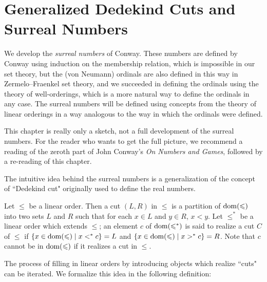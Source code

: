 \chapter[Surreal Numbers]{Generalized Dedekind Cuts and\\ Surreal Numbers}


We develop the {\itshape surreal numbers\/} of Conway.
These numbers are defined by Conway using induction on the
membership relation, which is impossible in our set
theory, but the (von Neumann) ordinals are also 
defined in this way in Zermelo--Fraenkel set
theory, and we succeeded in
defining the ordinals using the theory of
well-orderings, which is a more natural way to
define the ordinals in any case.  The surreal numbers will be defined
using concepts from the theory of linear orderings in a way analogous to the way in which the ordinals were
defined.

This chapter is really only a sketch, not a full development of the
surreal numbers.  For the reader who wants to get the full picture, we
recommend a reading of the zeroth part of John Conway's {\itshape On
Numbers and Games}, followed by a re-reading of this chapter.

The intuitive idea behind the surreal numbers is a
generalization of the concept of ``Dedekind cut" originally
used to define the real numbers.

\begin{definition}
 Let $\leq$ be a linear order.  Then a {\upshape cut}
 $(L,R)$ in $\leq$ is a partition of $\mathop{\mathrm{dom}}(\leqslant)$ into two
 sets $L$ and $R$ such that for each $x \in L$ 
 and $y \in R$, $x < y$.  Let $\leq^*$ be a linear order which extends $\leq$;
 an element $c$ of $\mathop{\mathrm{dom}}(\leqslant^*)$ is said to {\upshape realize} a cut $C$ of
 $\leq$ if $\{x \in \mathop{\mathrm{dom}}(\leqslant) \mid x <^* c\} = L$ and $\{x \in \mathop{\mathrm{dom}}(\leqslant) \mid x
 >^* c\} =  R$.  Note that $c$ cannot be in $\mathop{\mathrm{dom}}(\leqslant)$ if it realizes a cut
 in $\leq$.
\end{definition}

The process of filling in linear orders by introducing
objects which realize ``cuts" can be iterated.  We formalize this idea in the
following definition:

